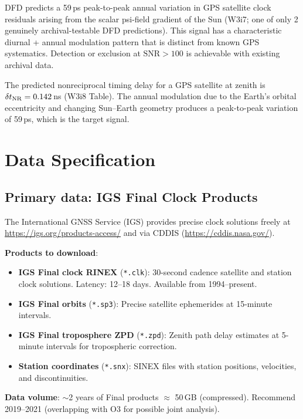 \documentclass[11pt]{article}
\newcommand{\SNR}{\mathrm{SNR}}
\begin{document}
DFD predicts a 59\,ps peak-to-peak annual variation in GPS satellite
clock residuals arising from the scalar psi-field gradient of the
Sun (W3i7; one of only 2 genuinely archival-testable DFD predictions).
This signal has a characteristic diurnal + annual modulation pattern
that is distinct from known GPS systematics. Detection or exclusion
at $\SNR > 100$ is achievable with existing archival data.

The predicted nonreciprocal timing delay for a GPS satellite at zenith
is $\delta t_{\rm NR} = 0.142$\,ns (W3i8 Table). The annual modulation
due to the Earth's orbital eccentricity and changing Sun--Earth geometry
produces a peak-to-peak variation of 59\,ps, which is the target signal.

\section{Data Specification}

\subsection{Primary data: IGS Final Clock Products}

The International GNSS Service (IGS) provides precise clock solutions
freely at \url{https://igs.org/products-access/} and via CDDIS
(\url{https://cddis.nasa.gov/}).

\textbf{Products to download}:
\begin{itemize}[nosep]
\item \textbf{IGS Final clock RINEX} (\texttt{*.clk}): 30-second
  cadence satellite and station clock solutions. Latency: 12--18 days.
  Available from 1994--present.
\item \textbf{IGS Final orbits} (\texttt{*.sp3}): Precise satellite
  ephemerides at 15-minute intervals.
\item \textbf{IGS Final troposphere ZPD} (\texttt{*.zpd}): Zenith
  path delay estimates at 5-minute intervals for tropospheric
  correction.
\item \textbf{Station coordinates} (\texttt{*.snx}): SINEX files
  with station positions, velocities, and discontinuities.
\end{itemize}

\textbf{Data volume}: $\sim$2 years of Final products $\approx$ 50\,GB
(compressed). Recommend 2019--2021 (overlapping with O3 for possible
joint analysis).
\end{document}
